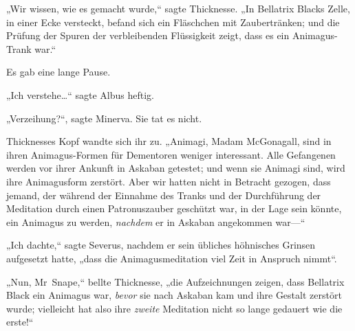 „Wir wissen, wie es gemacht wurde,“ sagte Thicknesse. „In Bellatrix Blacks Zelle, in einer Ecke versteckt, befand sich ein Fläschchen mit Zaubertränken; und die Prüfung der Spuren der verbleibenden Flüssigkeit zeigt, dass es ein Animagus-Trank war.“

Es gab eine lange Pause.

„Ich verstehe…“ sagte Albus heftig.

„Verzeihung?“, sagte Minerva. Sie tat es nicht.

Thicknesses Kopf wandte sich ihr zu. „Animagi, Madam McGonagall, sind in ihren Animagus-Formen für Dementoren weniger interessant. Alle Gefangenen werden vor ihrer Ankunft in Askaban getestet; und wenn sie Animagi sind, wird ihre Animagusform zerstört. Aber wir hatten nicht in Betracht gezogen, dass jemand, der während der Einnahme des Tranks und der Durchführung der Meditation durch einen Patronuszauber geschützt war, in der Lage sein könnte, ein Animagus zu werden, \emph{nachdem} er in Askaban angekommen war—“

„Ich dachte,“ sagte Severus, nachdem er sein übliches höhnisches Grinsen aufgesetzt hatte, „dass die Animagusmeditation viel Zeit in Anspruch nimmt“.

„Nun, Mr~Snape,“ bellte Thicknesse, „die Aufzeichnungen zeigen, dass Bellatrix Black ein Animagus war, \emph{bevor} sie nach Askaban kam und ihre Gestalt zerstört wurde; vielleicht hat also ihre \emph{zweite} Meditation nicht so lange gedauert wie die erste!“

